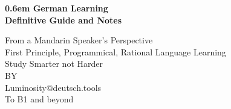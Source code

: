 \clearpage
\newcommand\nbvspace[1][3]{\vspace*{\stretch{#1}}}
\newcommand\nbstretchyspace{\spaceskip0.5em plus 0.25em minus 0.25em}
\newcommand{\nbtitlestretch}{\spaceskip0.6em}
\pagestyle{empty}
\begin{center}
    \bfseries
    \nbvspace[1]
    \Huge
    {\nbtitlestretch\huge
        German Learning \\Definitive Guide and Notes}

    \nbvspace[1]
    \normalsize

    From a Mandarin Speaker's Perspective\\
    First Principle, Programmical, Rational Language Learning\\
    Study Smarter not Harder \\
    \nbvspace[1]
    \small BY\\
    \Large Luminosity@deutsch.tools\\[0.5em]
    \footnotesize To B1 and beyond \\

    \nbvspace[2]


\end{center}
